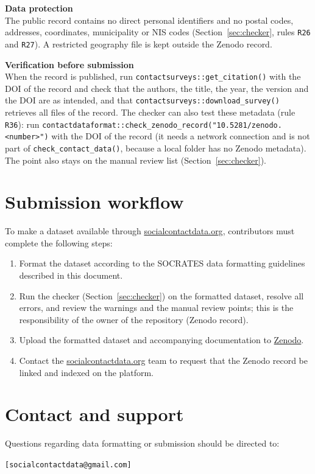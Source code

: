 \documentclass[11pt,a4paper]{article}
\begin{document}
\medskip
\noindent \textbf{Data protection} \\
The public record contains no direct personal identifiers and no postal codes, addresses, coordinates, municipality or NIS codes (Section~\ref{sec:checker}, rules \texttt{R26} and \texttt{R27}). A restricted geography file is kept outside the Zenodo record.

\medskip
\noindent \textbf{Verification before submission} \\
When the record is published, run \texttt{contactsurveys::get\_citation()} with the DOI of the record and check that the authors, the title, the year, the version and the DOI are as intended, and that \texttt{contactsurveys::download\_survey()} retrieves all files of the record. The checker can also test these metadata (rule \texttt{R36}): run \texttt{contactdataformat::check\_zenodo\_record("10.5281/zenodo.<number>")} with the DOI of the record (it needs a network connection and is not part of \texttt{check\_contact\_data()}, because a local folder has no Zenodo metadata). The point also stays on the manual review list (Section~\ref{sec:checker}).

\section{Submission workflow}
\label{sec:workflow}

To make a dataset available through \href{https://socialcontactdata.org}{socialcontactdata.org}, contributors must complete the following steps:
\begin{enumerate}
    \item Format the dataset according to the SOCRATES data formatting guidelines described in this document.
    \item Run the checker (Section~\ref{sec:checker}) on the formatted dataset, resolve all errors, and review the warnings and the manual review points; this is the responsibility of the owner of the repository (Zenodo record).
    \item Upload the formatted dataset and accompanying documentation to \href{https://zenodo.org}{Zenodo}.
    \item Contact the \href{https://socialcontactdata.org}{socialcontactdata.org} team to request that the Zenodo record be linked and indexed on the platform.
\end{enumerate}


\section{Contact and support}
Questions regarding data formatting or submission should be directed to:
\begin{center}
\texttt{[socialcontactdata@gmail.com]}
\end{center}
\end{document}
